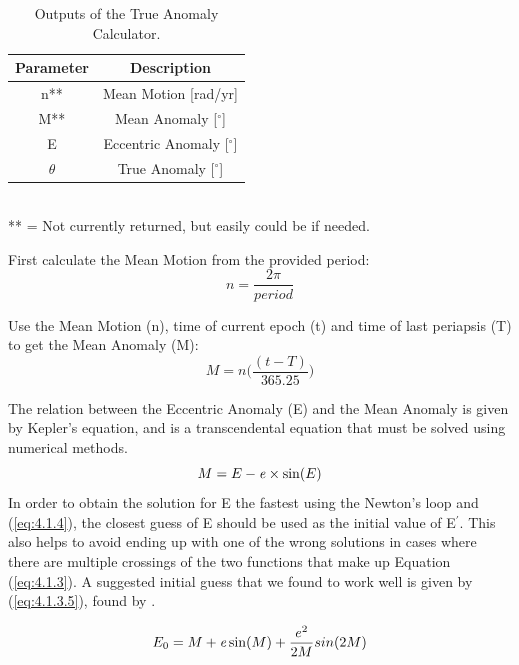 \documentclass[12pt,preprint]{aastex}
\begin{document}

\begin{table}[h]
\centering
\caption{ Outputs of the True Anomaly Calculator.}
\begin{tabular}{c c}
\hline\hline
Parameter & Description \\
\hline
n** & Mean Motion [rad/yr] \\
M** & Mean Anomaly [$^{\circ}$]\\
E & Eccentric Anomaly [$^{\circ}$]\\
$\theta$ & True Anomaly [$^{\circ}$]\\
\hline
\end{tabular}
\\
 ** = Not currently returned, but easily could be if needed.
\end{table}
\pagebreak

First calculate the Mean Motion from the provided period:
\begin{equation}\label{eq:4.1.1}
n = \frac{2\pi}{period} 
\end{equation}

Use the Mean Motion (n), time of current epoch (t) and time of last periapsis (T) to get the Mean Anomaly (M):
\begin{equation}\label{eq:4.1.2}
M = n \bigg( \frac{(t-T)}{365.25} \bigg)
\end{equation}

The relation between the Eccentric Anomaly (E) and the Mean Anomaly is given by Kepler's equation, and is a transcendental equation that must be solved using numerical methods.
\begin{equation}\label{eq:4.1.3}
M = E - {\it e}\times\sin(E)
\end{equation}
In order to obtain the solution for E the fastest using the Newton's loop and (\ref{eq:4.1.4}), the closest guess of E should be used as the initial value of E$^{\prime}$.  This also helps to avoid ending up with one of the wrong solutions in cases where there are multiple crossings of the two functions that make up Equation (\ref{eq:4.1.3}).  A suggested initial guess that we found to work well is given by (\ref{eq:4.1.3.5}), found by \citep{Argyle}.

\begin{equation}\label{eq:4.1.3.5}
E_0 = M+{\it e}\sin(M) + \frac{e^2}{2M}sin(2M)
\end{equation}
\end{document}
